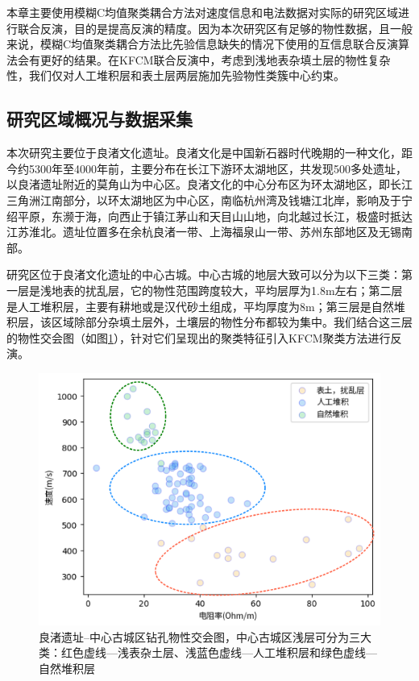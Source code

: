 本章主要使用模糊C均值聚类耦合方法对速度信息和电法数据对实际的研究区域进行联合反演，目的是提高反演的精度。因为本次研究区有足够的物性数据，且一般来说，模糊C均值聚类耦合方法比先验信息缺失的情况下使用的互信息联合反演算法会有更好的结果。在KFCM联合反演中，考虑到浅地表杂填土层的物性复杂性，我们仅对人工堆积层和表土层两层施加先验物性类簇中心约束。

\subsection{研究区域概况与数据采集}

本次研究主要位于良渚文化遗址。良渚文化是中国新石器时代晚期的一种文化，距今约5300年至4000年前，主要分布在长江下游环太湖地区，共发现500多处遗址，以良渚遗址附近的莫角山为中心区。良渚文化的中心分布区为环太湖地区，即长江三角洲江南部分，以环太湖地区为中心区，南临杭州湾及钱塘江北岸，影响及于宁绍平原，东濒于海，向西止于镇江茅山和天目山山地，向北越过长江，极盛时抵达江苏淮北。遗址位置多在余杭良渚一带、上海福泉山一带、苏州东部地区及无锡南部。

研究区位于良渚文化遗址的中心古城。中心古城的地层大致可以分为以下三类：第一层是浅地表的扰乱层，它的物性范围跨度较大，平均层厚为1.8m左右；第二层是人工堆积层，主要有耕地或是汉代砂土组成，平均厚度为8m；第三层是自然堆积层，该区域除部分杂填土层外，土壤层的物性分布都较为集中。我们结合这三层的物性交会图（如图\ref{fig:pro_intersection}），针对它们呈现出的聚类特征引入KFCM聚类方法进行反演。

\begin{figure}[h]
    \centering
    \includegraphics[width=\textwidth]{figure/thesis/output_revised.png}
    \caption{良渚遗址--中心古城区钻孔物性交会图，中心古城区浅层可分为三大类：红色虚线—浅表杂土层、浅蓝色虚线—人工堆积层和绿色虚线—自然堆积层}
    \label{fig:pro_intersection}
\end{figure}

